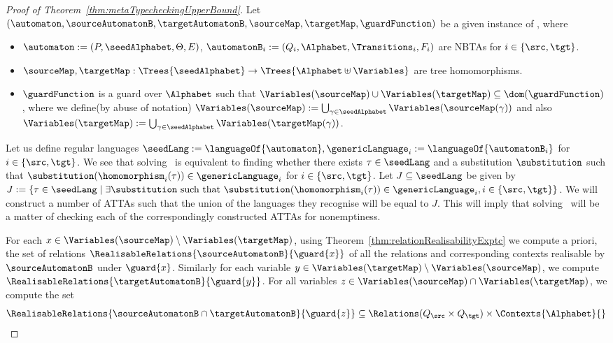 \begin{proof}[Proof of Theorem~\ref{thm:metaTypecheckingUpperBound}]
    Let $(\automaton, \sourceAutomatonB, \targetAutomatonB, \sourceMap, \targetMap, \guardFunction)$ be a given instance of \fullTypecheckingProblemFull, where
    \begin{itemize}
        \item $\automaton := (P, \seedAlphabet, \Theta, E)$, $\automatonB_i := (Q_i, \Alphabet, \Transitions_i, F_i)$ are NBTAs for $i \in \{\src, \tgt\}$.
        \item $\sourceMap, \targetMap : \Trees{\seedAlphabet} \to \Trees{\Alphabet \uplus \Variables}$ are tree homomorphisms.
        \item $\guardFunction$ is a guard over $\Alphabet$ such that $\Variables(\sourceMap) \cup \Variables(\targetMap) \subseteq \dom(\guardFunction)$, where we define(by abuse of notation) $\Variables(\sourceMap) := \bigcup_{\gamma \in \seedAlphabet} \Variables(\sourceMap(\gamma))$ and also $\Variables(\targetMap) := \bigcup_{\gamma \in \seedAlphabet} \Variables(\targetMap(\gamma))$.
    \end{itemize}
    Let us define regular languages $\seedLang := \languageOf{\automaton}, \genericLanguage_i := \languageOf{\automatonB_i}$ for $i \in \{\src, \tgt\}$. We see that solving \fullTypecheckingProblemFull\ is equivalent to finding whether there exists $\tau \in \seedLang$ and a substitution $\substitution$ such that $\substitution(\homomorphism_i(\tau)) \in \genericLanguage_i$ for $i \in \{\src, \tgt\}$. Let $J \subseteq \seedLang$ be given by $J := \{\tau \in \seedLang \mid \exists\substitution\mbox{ such that }\substitution(\homomorphism_i(\tau)) \in \genericLanguage_i, i \in \{\src, \tgt\}\}$. We will construct a number of ATTAs such that the union of the languages they recognise will be equal to $J$. This will imply that solving \fullTypecheckingProblemFull\ will be a matter of checking each of the correspondingly constructed ATTAs for nonemptiness.

    For each $x \in \Variables(\sourceMap) \setminus \Variables(\targetMap)$, using Theorem~\ref{thm:relationRealisabilityExptc} we compute a priori, the set {of relations} $\RealisableRelations{\sourceAutomatonB}{\guard{x}}$ of all the relations and corresponding contexts realisable by $\sourceAutomatonB$ under $\guard{x}$. Similarly for each variable $y \in \Variables(\targetMap) \setminus \Variables(\sourceMap)$, we compute $\RealisableRelations{\targetAutomatonB}{\guard{y}}$.
    For all variables $z \in \Variables(\sourceMap) \cap \Variables(\targetMap)$, we compute the set
    \[ \RealisableRelations{\sourceAutomatonB \cap \targetAutomatonB}{\guard{z}} \subseteq \Relations(Q_\src \times Q_\tgt) \times \Contexts{\Alphabet}{} \]


\end{proof}

